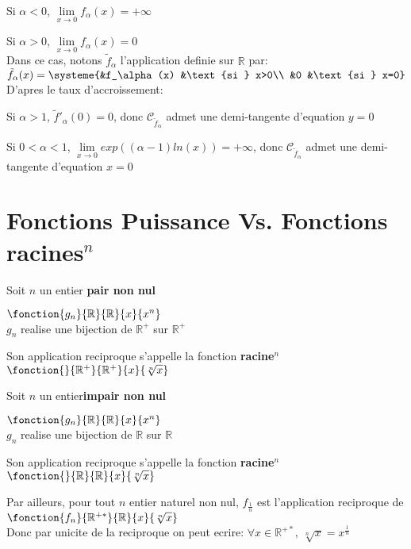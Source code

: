 \documentclass[12pt,twoside,a4paper]{article}
\begin{document}
				\begin{liste}
					\item Si $\alpha<0$, $\lim\limits_{x\rightarrow0}f_\alpha(x)=+\infty$
					\item Si $\alpha>0$, $\lim\limits_{x\rightarrow0}f_\alpha(x)=0$\\
							Dans ce cas, notons $\tilde{f}_\alpha$ l'application definie sur $\mathbb{R}$ par:\\
							$\tilde{f}_\alpha(x)=\systeme{&f_\alpha(x) &\text{si } x>0\\
							&0 &\text{si } x=0}$\\
							D'apres le taux d'accroissement:\begin{liste}
								\item Si $\alpha>1$, $\tilde{f}'_\alpha(0)=0$, donc $\mathscr{C}_{\tilde{f}_\alpha}$ admet une demi-tangente d'equation $y=0$
								\item Si $0<\alpha<1$, $\lim\limits_{x\rightarrow0}exp((\alpha-1)ln(x))=+\infty$, donc $\mathscr{C}_{\tilde{f}_\alpha}$ admet une demi-tangente d'equation $x=0$
							\end{liste}
				\end{liste}
	\section{Fonctions Puissance Vs. Fonctions racines$^n$}
		\begin{liste}
			\item Soit $n$ un entier \textbf{pair non nul}
					\begin{tab}
						$\fonction{g_n}{\mathbb{R}}{\mathbb{R}}{x}{x^n}$\\
						$g_n$ realise une bijection de $\mathbb{R}^+$ sur $\mathbb{R}^+$
					\end{tab}
					Son application reciproque s'appelle la fonction \textbf{racine$^n$}
					$\fonction{}{\mathbb{R}^+}{\mathbb{R}^+}{x}{\sqrt[n]{x}}$
			\item Soit $n$ un entier\textbf{impair non nul}
					\begin{tab}
						$\fonction{g_n}{\mathbb{R}}{\mathbb{R}}{x}{x^n}$\\
						$g_n$ realise une bijection de $\mathbb{R}$ sur $\mathbb{R}$
					\end{tab}
					Son application reciproque s'appelle la fonction \textbf{racine$^n$}
					$\fonction{}{\mathbb{R}}{\mathbb{R}}{x}{\sqrt[n]{x}}$
			\item Par ailleurs, pour tout $n$ entier naturel non nul, $f_\frac{1}{n}$ est l'application reciproque de $\fonction{f_n}{\mathbb{R}^{+*}}{\mathbb{R}}{x}{\sqrt[n]{x}}$\\
			Donc par unicite de la reciproque on peut ecrire: $\forall x\in\mathbb{R}^{+*},\ \sqrt[n]{x}=x^\frac{1}{n}$\\
		\end{liste}
\end{document}
